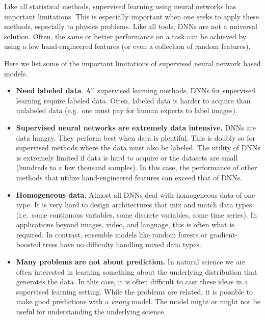 \documentclass[%
oneside,                 %
final,                   %
10pt]{article}
\begin{document}
Like all statistical methods, supervised learning using neural
networks has important limitations. This is especially important when
one seeks to apply these methods, especially to physics problems. Like
all tools, DNNs are not a universal solution. Often, the same or
better performance on a task can be achieved by using a few
hand-engineered features (or even a collection of random
features). 

Here we list some of the important limitations of supervised neural network based models. 



\begin{itemize}
\item \textbf{Need labeled data}. All supervised learning methods, DNNs for supervised learning require labeled data. Often, labeled data is harder to acquire than unlabeled data (e.g.~one must pay for human experts to label images).

\item \textbf{Supervised neural networks are extremely data intensive.} DNNs are data hungry. They perform best when data is plentiful. This is doubly so for supervised methods where the data must also be labeled. The utility of DNNs is extremely limited if data is hard to acquire or the datasets are small (hundreds to a few thousand samples). In this case, the performance of other methods that utilize hand-engineered features can exceed that of DNNs.

\item \textbf{Homogeneous data.} Almost all DNNs deal with homogeneous data of one type. It is very hard to design architectures that mix and match data types (i.e.~some continuous variables, some discrete variables, some time series). In applications beyond images, video, and language, this is often what is required. In contrast, ensemble models like random forests or gradient-boosted trees have no difficulty handling mixed data types.

\item \textbf{Many problems are not about prediction.} In natural science we are often interested in learning something about the underlying distribution that generates the data. In this case, it is often difficult to cast these ideas in a supervised learning setting. While the problems are related, it is possible to make good predictions with a \emph{wrong} model. The model might or might not be useful for understanding the underlying science.
\end{itemize}
\end{document}
